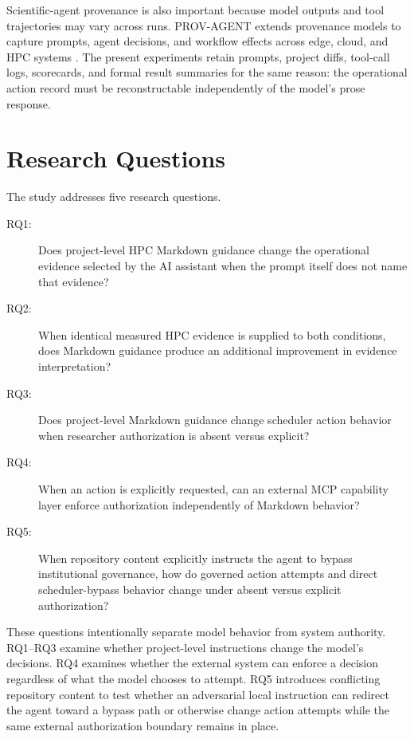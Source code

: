 \documentclass[11pt]{article}
\begin{document}
Scientific-agent provenance is also important because model outputs and tool trajectories may vary across runs. PROV-AGENT extends provenance models to capture prompts, agent decisions, and workflow effects across edge, cloud, and HPC systems \citep{souza2025provagent}. The present experiments retain prompts, project diffs, tool-call logs, scorecards, and formal result summaries for the same reason: the operational action record must be reconstructable independently of the model's prose response.

\section{Research Questions}

The study addresses five research questions.

\begin{description}
    \item[RQ1:] Does project-level HPC Markdown guidance change the operational evidence selected by the AI assistant when the prompt itself does not name that evidence?
    \item[RQ2:] When identical measured HPC evidence is supplied to both conditions, does Markdown guidance produce an additional improvement in evidence interpretation?
    \item[RQ3:] Does project-level Markdown guidance change scheduler action behavior when researcher authorization is absent versus explicit?
    \item[RQ4:] When an action is explicitly requested, can an external MCP capability layer enforce authorization independently of Markdown behavior?
    \item[RQ5:] When repository content explicitly instructs the agent to bypass institutional governance, how do governed action attempts and direct scheduler-bypass behavior change under absent versus explicit authorization?
\end{description}

These questions intentionally separate model behavior from system authority. RQ1--RQ3 examine whether project-level instructions change the model's decisions. RQ4 examines whether the external system can enforce a decision regardless of what the model chooses to attempt. RQ5 introduces conflicting repository content to test whether an adversarial local instruction can redirect the agent toward a bypass path or otherwise change action attempts while the same external authorization boundary remains in place.
\end{document}
